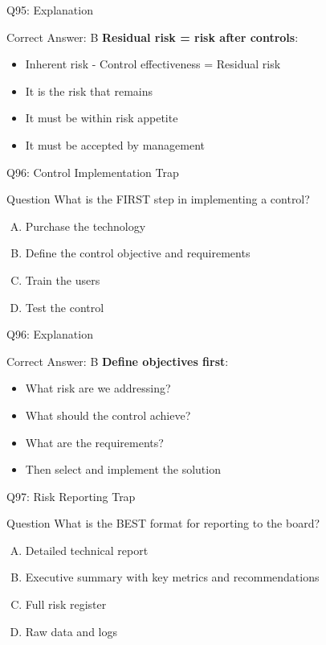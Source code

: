 \documentclass{beamer}
\begin{document}
	\begin{frame}{Q95: Explanation}
		\begin{block}{Correct Answer: B}
			\textbf{Residual risk = risk after controls}:
			\begin{itemize}
				\item Inherent risk - Control effectiveness = Residual risk
				\item It is the risk that remains
				\item It must be within risk appetite
				\item It must be accepted by management
			\end{itemize}
		\end{block}
	\end{frame}
	
	\begin{frame}{Q96: Control Implementation Trap}
		\begin{block}{Question}
			What is the FIRST step in implementing a control?
		\end{block}
		\begin{enumerate}[(A)]
			\item Purchase the technology
			\item Define the control objective and requirements
			\item Train the users
			\item Test the control
		\end{enumerate}
	\end{frame}
	
	\begin{frame}{Q96: Explanation}
		\begin{block}{Correct Answer: B}
			\textbf{Define objectives first}:
			\begin{itemize}
				\item What risk are we addressing?
				\item What should the control achieve?
				\item What are the requirements?
				\item Then select and implement the solution
			\end{itemize}
		\end{block}
	\end{frame}
	
	\begin{frame}{Q97: Risk Reporting Trap}
		\begin{block}{Question}
			What is the BEST format for reporting to the board?
		\end{block}
		\begin{enumerate}[(A)]
			\item Detailed technical report
			\item Executive summary with key metrics and recommendations
			\item Full risk register
			\item Raw data and logs
		\end{enumerate}
	\end{frame}
	
\end{document}
